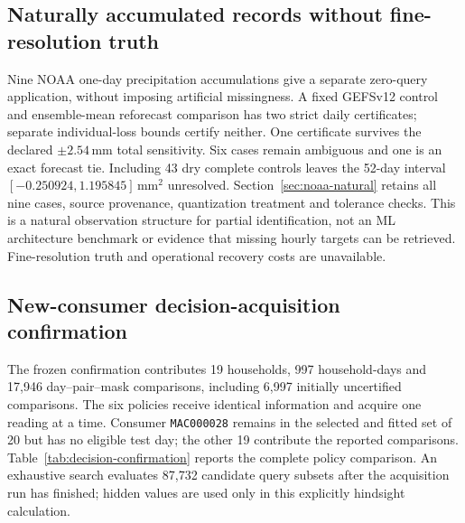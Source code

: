 \documentclass[12pt]{article}
\begin{document}
\subsection{Naturally accumulated records without fine-resolution truth}
Nine NOAA one-day precipitation accumulations give a separate zero-query
application, without imposing artificial missingness. A fixed GEFSv12 control
and ensemble-mean reforecast comparison has two strict daily certificates;
separate individual-loss bounds certify neither. One certificate survives
the declared $\pm2.54$\,mm total sensitivity. Six cases remain ambiguous and
one is an exact forecast tie. Including 43 dry complete controls leaves the
52-day interval $[-0.250924,1.195845]\,\mathrm{mm}^2$ unresolved.
Section~\ref{sec:noaa-natural} retains all nine cases, source provenance,
quantization treatment and tolerance checks. This is a natural observation
structure for partial identification, not an ML architecture benchmark or
evidence that missing hourly targets can be retrieved. Fine-resolution truth
and operational recovery costs are unavailable.


\subsection{New-consumer decision-acquisition confirmation}\label{sec:decision-confirmation-results}
The frozen confirmation contributes 19 households,
997 household-days and 17,946 day--pair--mask
comparisons, including 6,997 initially uncertified
comparisons. The six policies receive identical information and acquire one
reading at a time. Consumer \texttt{MAC000028} remains in the selected and fitted set of 20 but has no eligible test day; the other 19 contribute the reported comparisons.
Table~\ref{tab:decision-confirmation} reports the complete
policy comparison. An exhaustive search evaluates 87,732
candidate query subsets after the acquisition run has finished; hidden values
are used only in this explicitly hindsight calculation.
\end{document}
